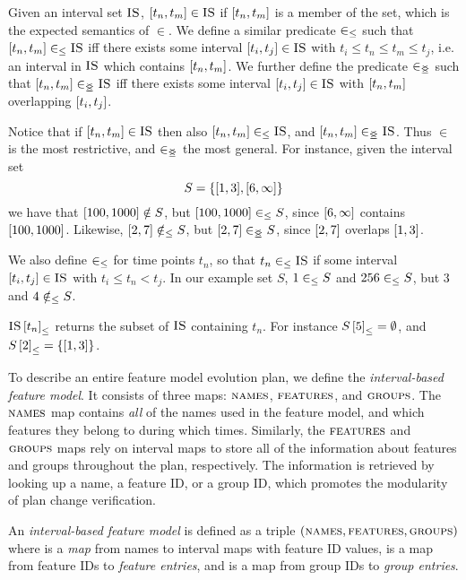 Given an interval set $\textsc{IS}$, $\interval{t_n}{t_m} \in \map{IS}$ if $\interval{t_n}{t_m}$ is a member of the set, which is the expected semantics of $\in$. We define a similar predicate $\in_\leq$ such that $\interval{t_n}{t_m} \inn \map{IS}$ iff there exists some interval $\interval{t_i}{t_j} \in \map{IS}$ with $t_i \leq t_n \leq t_m \leq t_j$, i.e. an interval in $\textsc{IS}$ which contains $\interval{t_n}{t_m}$. We further define the predicate $\in_{\leq\!\!\!\!\geq{}}$ such that $\interval{t_n}{t_m} \innr \map{IS}$ iff there exists some interval $\interval{t_i}{t_j} \in \map{IS}$ with $\interval{t_n}{t_m}$ overlapping $\interval{t_i}{t_j}$. 

Notice that if $\interval{t_n}{t_m} \in \map{IS}$ then also $\interval{t_n}{t_m} \inn \map{IS}$, and $\interval{t_n}{t_m} \innr \map{IS}$. Thus $\in$ is the most restrictive, and $\in_{\leq\!\!\!\!\geq{}}$ the most general.
For instance, given the interval set 
\[
  S = \set{\interval{1}{3}, \interval{6}{\forever}}
\]
we have that $\interval{100}{1000} \notin S$, but $\interval{100}{1000} \inn S$, since $\interval{6}{\forever}$ contains $\interval{100}{1000}$. Likewise,  $\interval{2}{7} \notinn S$, but $\interval{2}{7} \innr S$, since $\interval{2}{7}$ overlaps $\interval{1}{3}$.


We also define $\in_\leq$ for time points $t_n$, so that $t_n \in_\leq \textsc{IS}$ if some interval $\interval{t_i}{t_j} \in \map{IS}$ with $t_i \leq t_n < t_j$. In our example set $S$, $1 \in_\leq S$ and $256 \in_\leq S$, but $3$ and $4 \notin_\leq S$.

${\textsc{IS} \left[ t_n \right]}_{\leq}$ returns the subset of $\textsc{IS}$ containing $t_n$. For instance ${S \left[ 5 \right]}_{\leq} = \emptyset$, and $\containing{S}{2} = \set{\interval{1}{3}}$.

To describe an entire feature model evolution plan, we define the \emph{interval-based feature model}. It consists of three maps: $\textsc{names}{}$, $\textsc{features}{}$, and $\textsc{groups}{}{}$. The $\textsc{names}{}$ map contains \emph{all} of the names used in the feature model, and which features they belong to during which times. Similarly, the $\textsc{features}{}$ and $\textsc{groups}{}{}$ maps rely on interval maps to store all of the information about features and groups throughout the plan, respectively. The information is retrieved by looking up a name, a feature ID, or a group ID, which promotes the modularity of plan change verification.
\\

\begin{definition}
  An \emph{interval-based feature model} is defined as a triple $(\textsc{names}, \textsc{features}, \textsc{groups}{})$ where \names{} is a \emph{map} from names to interval maps with feature ID values, \features{} is a map from feature IDs to \emph{feature entries}, and \groups{} is a map from group IDs to \emph{group entries}. 
  \label{def:interval-based-feature-model}
\end{definition}

